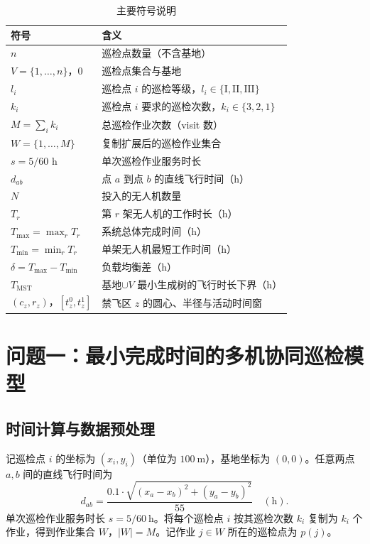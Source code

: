 \documentclass[12pt,a4paper]{ctexart}
\begin{document}
\begin{table}[H]
  \centering
  \caption{主要符号说明}
  \label{tab:symbol}
  \small
  \begin{tabular}{@{}ll@{}}
    \toprule
    符号 & 含义 \\
    \midrule
    $n$ & 巡检点数量（不含基地）\\
    $V=\{1,\dots,n\}$，$0$ & 巡检点集合与基地 \\
    $l_i$ & 巡检点 $i$ 的巡检等级，$l_i\in\{\mathrm{I,II,III}\}$ \\
    $k_i$ & 巡检点 $i$ 要求的巡检次数，$k_i\in\{3,2,1\}$ \\
    $M=\sum_i k_i$ & 总巡检作业次数（visit 数）\\
    $W=\{1,\dots,M\}$ & 复制扩展后的巡检作业集合 \\
    $s=5/60$ h & 单次巡检作业服务时长 \\
    $d_{ab}$ & 点 $a$ 到点 $b$ 的直线飞行时间（h）\\
    $N$ & 投入的无人机数量 \\
    $T_r$ & 第 $r$ 架无人机的工作时长（h）\\
    $T_{\max}=\max_r T_r$ & 系统总体完成时间（h）\\
    $T_{\min}=\min_r T_r$ & 单架无人机最短工作时间（h）\\
    $\delta=T_{\max}-T_{\min}$ & 负载均衡差（h）\\
    $T_{\mathrm{MST}}$ & 基地$\cup V$ 最小生成树的飞行时长下界（h）\\
    $(c_z,r_z)$，$[t_z^0,t_z^1]$ & 禁飞区 $z$ 的圆心、半径与活动时间窗 \\
    \bottomrule
  \end{tabular}
\end{table}

\section{问题一：最小完成时间的多机协同巡检模型}

\subsection{时间计算与数据预处理}

记巡检点 $i$ 的坐标为 $(x_i,y_i)$（单位为 $100\ \mathrm{m}$），基地坐标为 $(0,0)$。任意两点 $a,b$ 间的直线飞行时间为
\begin{equation}
  d_{ab}=\frac{0.1\cdot\sqrt{(x_a-x_b)^2+(y_a-y_b)^2}}{55}\quad(\mathrm{h}).
  \label{eq:dist}
\end{equation}
单次巡检作业服务时长 $s=5/60\ \mathrm{h}$。将每个巡检点 $i$ 按其巡检次数 $k_i$ 复制为 $k_i$ 个作业，得到作业集合 $W$，$|W|=M$。记作业 $j\in W$ 所在的巡检点为 $p(j)$。
\end{document}
